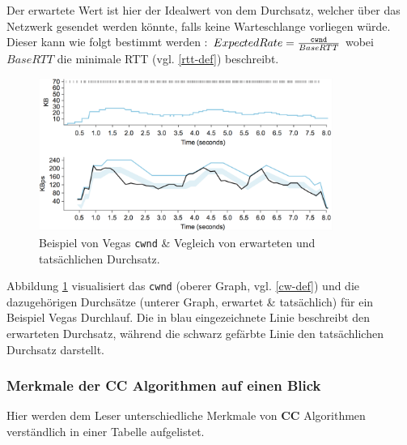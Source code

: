 \documentclass[paper=a4,fontsize=12pt,ngerman]{scrartcl}
\begin{document}
Der erwartete Wert ist hier der Idealwert von dem Durchsatz, welcher über das Netzwerk gesendet werden könnte, 
falls keine Warteschlange vorliegen würde. Dieser kann wie folgt bestimmt werden : 
$ ExpectedRate = \frac{\text{\texttt{cwnd}}}{BaseRTT}$ \cite{tcpccCh5}
wobei $BaseRTT$ die minimale RTT (vgl. \ref{rtt-def}) beschreibt.


\begin{figure}[ht] 
    \centering
    \includegraphics[height = 5cm]{./graphics/vegas.png}
    \caption{Beispiel von Vegas \texttt{cwnd} \& Vegleich von erwarteten und 
    tatsächlichen Durchsatz.\cite{tcpccCh5}} 
    \label{fig:vegasCWandThroughput}
\end{figure}

Abbildung \ref{fig:vegasCWandThroughput} visualisiert das \texttt{cwnd} (oberer Graph, vgl. \ref{cw-def}) und die 
dazugehörigen Durchsätze (unterer Graph, erwartet \& tatsächlich) für ein Beispiel Vegas Durchlauf.
Die in blau eingezeichnete Linie beschreibt den erwarteten Durchsatz, während die schwarz
gefärbte Linie den tatsächlichen Durchsatz darstellt.
 


\subsubsection{Merkmale der CC Algorithmen auf einen Blick}
Hier werden dem Leser unterschiedliche Merkmale von \textbf{CC} Algorithmen verständlich in einer 
Tabelle aufgelistet.
\end{document}
